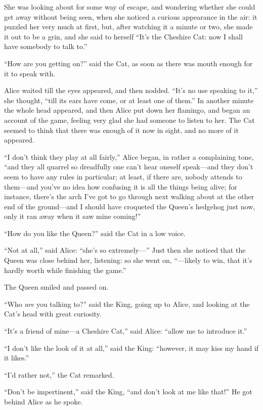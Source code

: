 \documentclass[book, 20pt]{extbook}
\begin{document}
She was looking about for some way of escape, and wondering whether she
could get away without being seen, when she noticed a curious appearance
in the air: it puzzled her very much at first, but, after watching it a
minute or two, she made it out to be a grin, and she said to herself
``It's the Cheshire Cat: now I shall have somebody to talk to.''

``How are you getting on?'' said the Cat, as soon as there was mouth
enough for it to speak with.

Alice waited till the eyes appeared, and then nodded. ``It's no use
speaking to it,'' she thought, ``till its ears have come, or at least
one of them.'' In another minute the whole head appeared, and then Alice
put down her flamingo, and began an account of the game, feeling very
glad she had someone to listen to her. The Cat seemed to think that
there was enough of it now in sight, and no more of it appeared.

``I don't think they play at all fairly,'' Alice began, in rather a
complaining tone, ``and they all quarrel so dreadfully one can't hear
oneself speak---and they don't seem to have any rules in particular; at
least, if there are, nobody attends to them---and you've no idea how
confusing it is all the things being alive; for instance, there's the
arch I've got to go through next walking about at the other end of the
ground---and I should have croqueted the Queen's hedgehog just now, only
it ran away when it saw mine coming!''

``How do you like the Queen?'' said the Cat in a low voice.

``Not at all,'' said Alice: ``she's so extremely---'' Just then she
noticed that the Queen was close behind her, listening: so she went on,
``---likely to win, that it's hardly worth while finishing the game.''

The Queen smiled and passed on.

``Who \emph{are} you talking to?'' said the King, going up to Alice, and
looking at the Cat's head with great curiosity.

``It's a friend of mine---a Cheshire Cat,'' said Alice: ``allow me to
introduce it.''

``I don't like the look of it at all,'' said the King: ``however, it may
kiss my hand if it likes.''

``I'd rather not,'' the Cat remarked.

``Don't be impertinent,'' said the King, ``and don't look at me like
that!'' He got behind Alice as he spoke.
\end{document}
